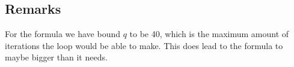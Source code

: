 \subsection{Remarks}
For the formula we have bound $q$ to be 40, which is the maximum amount of iterations the loop would be able to make. This does lead to the formula to maybe bigger than it needs.
